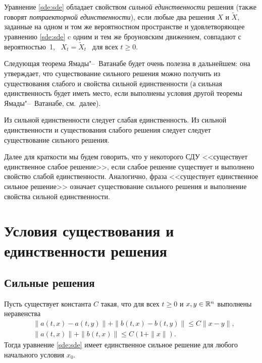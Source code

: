 \begin{definition}
Уравнение \eqref{sde:sde} обладает свойством \emph{сильной единственности} решения (также говорят \emph{потраекторной единственности}), если любые два решения $X$ и $\tilde X$, заданные на одном и том же вероятностном пространстве и удовлетворяющее уравнению \eqref{sde:sde} c одним и тем же броуновским движением, совпадают с вероятностью~1, \te\ $X_t=\tilde X_t$ \as\ для всех $t\ge 0$.
\end{definition}

Следующая теорема Ямады"--~Ватанабе будет очень полезна в дальнейшем: она утверждает, что существование сильного решения можно получить из существования слабого и свойства сильной единственности (а сильная единственность будет иметь место, если выполнены условия другой теоремы Ямады"--~Ватанабе, см.~далее).

\begin{theorem}
\label{sde:t:yw-1}
Из сильной единственности следует слабая единственность.
Из сильной единственности и существования слабого решения следует следует существование сильного решения.
\end{theorem}

Далее для краткости мы будем говорить, что у некоторого СДУ <<существует единственное слабое решение>>, если слабое решение существует и выполнено свойство слабой единственности.
Аналогично, фраза <<существует единственное сильное решение>> означает существование сильного решения и выполнение свойства сильной единственности.


\section{Условия существования и единственности решения}
\subsection{Сильные решения}

\begin{theorem}[К.~Ито]
Пусть существует константа $C$ такая, что для всех $t\ge 0$ и $x,y\in \mathbb{R}^n$ выполнены неравенства
\begin{align*}
&\|a(t,x) - a(t,y)\| + \|b(t,x) - b(t,y)\| \le C \|x-y\|,\\
&\|a(t,x)\| + \|b(t,x)\| \le C(1+\|x\|).
\end{align*}
Тогда уравнение \eqref{sde:sde} имеет единственное сильное решение для любого начального условия $x_0$.
\end{theorem}

